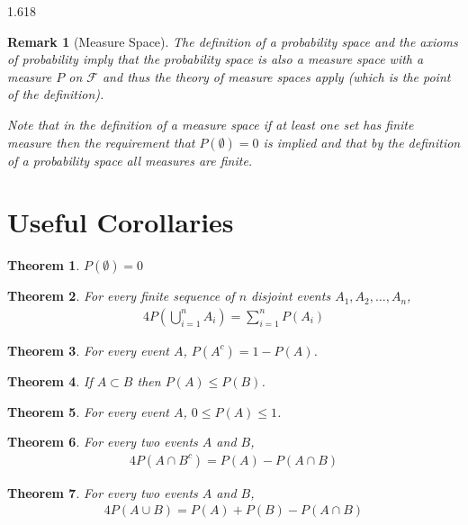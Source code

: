 \documentclass[11pt, oneside]{book}   	%
\newtheorem{remark}{Remark}[chapter]
\newtheorem{theorem}{Theorem}[chapter]
\begin{document}
\begin{spacing}{1.618}
		\begin{remark}[Measure Space]
			The definition of a probability space and the axioms of probability imply that the probability space is also a measure space with a measure $P$ on $\mathcal{F}$ and thus the theory of measure spaces apply (which is the point of the definition). 
			
			Note that in the definition of a measure space if at least one set has finite measure then the requirement that $P(\emptyset)=0$ is implied and that by the definition of a probability space all measures are finite. 
		\end{remark}

	\section{Useful Corollaries}
	
		\begin{theorem}
			$P(\emptyset)=0$		
		\end{theorem}
		\begin{theorem}
			For every finite sequence of $n$ disjoint events $A_1, A_2, \dots, A_n$, 
				\begin{alignat}{4}
					P\left(\bigcup_{i=1}^n A_i\right)=\sum_{i=1}^n P(A_i)
				\end{alignat}
		\end{theorem}
		\begin{theorem}
			For every event $A$, $P(A^c)=1-P(A)$. 
		\end{theorem}
		
		\begin{theorem}
			If $A\subset B$ then $P(A)\leq P(B)$. 
		\end{theorem}
		
		\begin{theorem}
			For every event $A$, $0\leq P(A)\leq 1$. 
		\end{theorem}
		
		\begin{theorem}
			For every two events $A$ and $B$, 
			\begin{alignat}{4}
				P(A\cap B^c)=P(A)-P(A\cap B)
			\end{alignat}
		\end{theorem}
		
		\begin{theorem}\label{Theorem:1:1}
			For every two events $A$ and $B$, 
			\begin{alignat}{4}
				P(A \cup B) = P(A)+P(B)-P(A\cap B)
			\end{alignat}
		\end{theorem}
		

\end{spacing}
\end{document}
